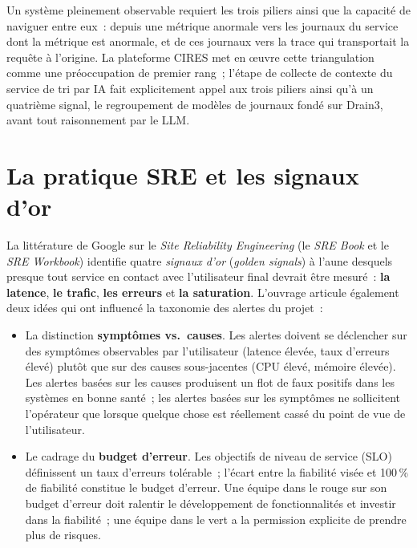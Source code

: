 \documentclass[11pt,a4paper,oneside]{report}
\begin{document}
Un système pleinement observable requiert les trois piliers ainsi
que la capacité de naviguer entre eux~: depuis une métrique anormale
vers les journaux du service dont la métrique est anormale, et de
ces journaux vers la trace qui transportait la requête à l'origine.
La plateforme CIRES met en \oe{}uvre cette triangulation comme une
préoccupation de premier rang~; l'étape de collecte de contexte du
service de tri par IA fait explicitement appel aux trois piliers
ainsi qu'à un quatrième signal, le regroupement de modèles de
journaux fondé sur Drain3, avant tout raisonnement par le LLM.

\section{La pratique SRE et les signaux d'or}

La littérature de Google sur le \emph{Site Reliability Engineering}
(le \emph{SRE Book} et le \emph{SRE Workbook}) identifie quatre
\emph{signaux d'or} (\emph{golden signals}) à l'aune desquels presque
tout service en contact avec l'utilisateur final devrait être
mesuré~: \textbf{la latence}, \textbf{le trafic}, \textbf{les
erreurs} et \textbf{la saturation}. L'ouvrage articule également deux
idées qui ont influencé la taxonomie des alertes du projet~:

\begin{itemize}
  \item La distinction \textbf{symptômes vs.\ causes}. Les alertes
        doivent se déclencher sur des symptômes observables par
        l'utilisateur (latence élevée, taux d'erreurs élevé) plutôt
        que sur des causes sous-jacentes (CPU élevé, mémoire élevée).
        Les alertes basées sur les causes produisent un flot de
        faux positifs dans les systèmes en bonne santé~; les alertes
        basées sur les symptômes ne sollicitent l'opérateur que
        lorsque quelque chose est réellement cassé du point de vue
        de l'utilisateur.
  \item Le cadrage du \textbf{budget d'erreur}. Les objectifs de
        niveau de service (SLO) définissent un taux d'erreurs
        tolérable~; l'écart entre la fiabilité visée et 100\,\% de
        fiabilité constitue le budget d'erreur. Une équipe dans le
        rouge sur son budget d'erreur doit ralentir le développement
        de fonctionnalités et investir dans la fiabilité~; une
        équipe dans le vert a la permission explicite de prendre
        plus de risques.
\end{itemize}
\end{document}
